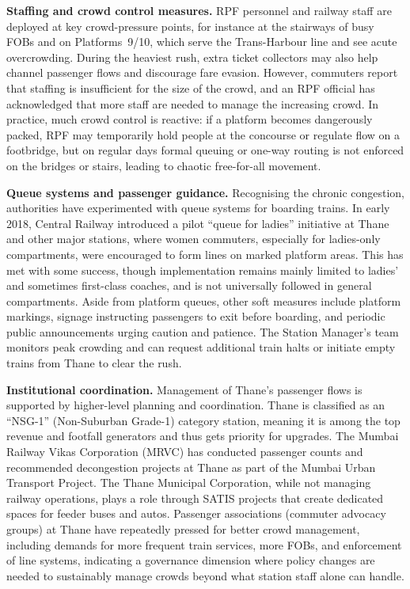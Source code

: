 \documentclass[11pt]{article}
\begin{document}
\textbf{Staffing and crowd control measures.} RPF personnel and railway staff are deployed at
key crowd-pressure points, for instance at the stairways of busy FOBs and on Platforms~9/10,
which serve the Trans-Harbour line and see acute overcrowding. During the heaviest rush, extra
ticket collectors may also help channel passenger flows and discourage fare evasion. However,
commuters report that staffing is insufficient for the size of the crowd, and an RPF official
has acknowledged that more staff are needed to manage the increasing crowd. In practice, much
crowd control is reactive: if a platform becomes dangerously packed, RPF may temporarily hold
people at the concourse or regulate flow on a footbridge, but on regular days formal queuing or
one-way routing is not enforced on the bridges or stairs, leading to chaotic free-for-all
movement.

\textbf{Queue systems and passenger guidance.} Recognising the chronic congestion, authorities
have experimented with queue systems for boarding trains. In early 2018, Central Railway
introduced a pilot ``queue for ladies'' initiative at Thane and other major stations, where women
commuters, especially for ladies-only compartments, were encouraged to form lines on marked
platform areas. This has met with some success, though implementation remains mainly limited to
ladies' and sometimes first-class coaches, and is not universally followed in general
compartments. Aside from platform queues, other soft measures include platform markings, signage
instructing passengers to exit before boarding, and periodic public announcements urging caution
and patience. The Station Manager's team monitors peak crowding and can request additional train
halts or initiate empty trains from Thane to clear the rush.

\textbf{Institutional coordination.} Management of Thane's passenger flows is supported by
higher-level planning and coordination. Thane is classified as an ``NSG-1'' (Non-Suburban
Grade-1) category station, meaning it is among the top revenue and footfall generators and thus
gets priority for upgrades. The Mumbai Railway Vikas Corporation (MRVC) has conducted passenger
counts and recommended decongestion projects at Thane as part of the Mumbai Urban Transport
Project. The Thane Municipal Corporation, while not managing railway operations, plays a role
through SATIS projects that create dedicated spaces for feeder buses and autos. Passenger
associations (commuter advocacy groups) at Thane have repeatedly pressed for better crowd
management, including demands for more frequent train services, more FOBs, and enforcement of
line systems, indicating a governance dimension where policy changes are needed to
sustainably manage crowds beyond what station staff alone can handle.
\end{document}
